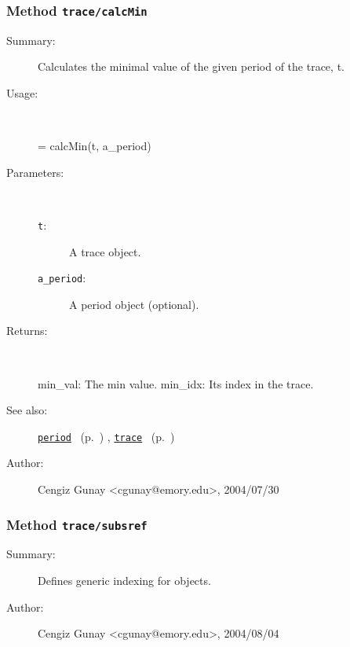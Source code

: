 \subsubsection[Method \texttt{calcMin}]{Method \texttt{trace/calcMin}}%
%
\label{ref_trace__calcMin}%
\hypertarget{ref_trace__calcMin}{}%
\begin{description}
\item[Summary:]Calculates the minimal value of the given period 
 		of the trace, t. 
%
\item[Usage:]~%
\begin{lyxcode}%
[min\_val, min\_idx] = calcMin(t, a\_period)
%
\end{lyxcode}%
%
%
\item[Parameters:]~
\begin{description}%
\item[\texttt{t}:]
 A trace object.
\item[\texttt{a\_period}:]
 A period object (optional).
\end{description}%
%
\item[Returns:]~

	min\_val: The min value.
	min\_idx: Its index in the trace.
%
%
\item[See also:]%
\hyperlink{ref_period}{\texttt{period}}%
\ (p.~\pageref{ref_period})%
%
, \hyperlink{ref_trace}{\texttt{trace}}%
\ (p.~\pageref{ref_trace})%
%
%
\item[Author:]%
Cengiz Gunay <cgunay@emory.edu>, 2004/07/30%
\end{description}
\methodline%
\subsubsection[Method \texttt{subsref}]{Method \texttt{trace/subsref}}%
%
\label{ref_trace__subsref}%
\hypertarget{ref_trace__subsref}{}%
\begin{description}
\item[Summary:]Defines generic indexing for objects.
%
%
%
%
%
%
%
\item[Author:]%
Cengiz Gunay <cgunay@emory.edu>, 2004/08/04%
\end{description}
\methodline%
